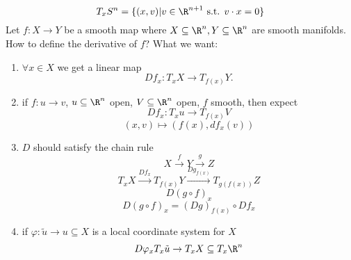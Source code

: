 $$T_xS^n=\{(x,v) | v\in \R^{n+1} \text{ s.t. } v \cdot x =0 \}$$
Let $f:X\to Y$ be a smooth map where $X \subseteq \R^n , Y \subseteq \R^n $ are smooth manifolds.
\newline How to define the derivative of $f$?
\newline What we want:
  \begin{enumerate}[(1)]
    \item $\forall x\in X$ we get a linear map
      $$Df_x: T_xX \to T_{f(x)}Y.$$
    \item if $f:u \to v$, $u \subseteq \R^n $ open, $V \subseteq \R^n $ open, $f$ smooth, then expect
      $$Df_x: T_xu \to T_{f(x)}V$$
      $$(x,v)\mapsto \left(f(x),df_x(v)\right)$$
    \item $D$ should satisfy the chain rule
      $$X\xrightarrow{f}Y\xrightarrow{g}Z$$
      $$
        T_xX \xrightarrow{Df_x}T_{f(x)}Y \xrightarrow{Dg_{f(x)}}T_{g(f(x))}Z
      $$
      $$  D(g\circ f )_x$$
    $$D(g\circ f)_x=(Dg)_{f(x)}\circ Df_x $$
    \item if $\varphi :\tilde{u}\to u\subseteq X$ is a local coordinate system for $X$
      $$
        D \varphi _xT_x\tilde{u}\to T_xX \subseteq T_x\R^n
      $$

  \end{enumerate}
